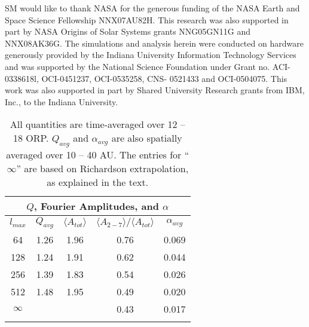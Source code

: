 \documentclass[manuscript]{aastex}
\begin{document}
\acknowledgements

SM would like to thank NASA for the generous funding of the
NASA Earth and Space Science Fellowship NNX07AU82H. This
research was also supported in part by NASA Origins of Solar
Systems grants NNG05GN11G and NNX08AK36G. The simulations
and analysis herein were conducted on hardware generously
provided by the Indiana University Information Technology Services
and was supported by the National Science Foundation under
Grant no. ACI-0338618l, OCI-0451237, OCI-0535258, CNS-
0521433 and OCI-0504075. This work was also supported in part
by Shared University Research grants from IBM, Inc., to the Indiana
University.






\newpage


\begin{table}
\begin{center}
\begin{tabular}{ccccc}
\multicolumn{5}{c}{$Q$, Fourier Amplitudes, and $\alpha$}\\ \hline\hline
$l_{max}$ & $Q_{avg}$   & $\langle A_{tot} \rangle$   & $\langle A_{2-7} \rangle / \langle A_{tot} \rangle$ & $\alpha_{avg}$ \\\hline
64   & 1.26 & 1.96 &  0.76 & 0.069 \\
128 & 1.24 & 1.91 &  0.62 & 0.044 \\
256 & 1.39 & 1.83 &  0.54 & 0.026 \\
512 & 1.48 & 1.95 &  0.49 & 0.020 \\ 
$\infty$ & & &0.43 & 0.017 \\ \hline
\label{tbl:ams}
\end{tabular}
\caption{ All quantities are time-averaged over 12 -- 18 ORP.
$Q_{avg}$ and $\alpha_{avg}$ are also spatially
averaged over 10 -- 40 AU.  The entries for ``$\infty$'' are based on Richardson extrapolation,
as explained in the text.}  
\end{center}
\end{table}


\end{document}
